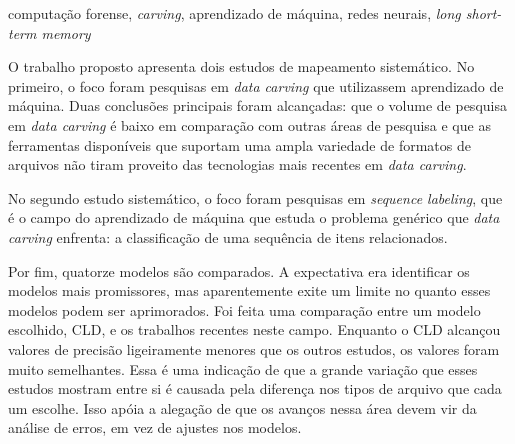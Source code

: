 \documentclass[english,oneside]{pucrs-ppgcc}
\begin{document}
\begin{resumo}{computação forense, \textit{carving}, aprendizado de máquina, redes neurais, \textit{long short-term memory}}

O trabalho proposto apresenta dois estudos de mapeamento sistemático.
No primeiro, o foco foram pesquisas em \textit{data carving} que utilizassem aprendizado de máquina. Duas conclusões principais foram alcançadas: que o volume de pesquisa em \textit{data carving} é baixo em comparação com outras áreas de pesquisa e que as ferramentas disponíveis que suportam uma ampla variedade de formatos de arquivos não tiram proveito das tecnologias mais recentes em \textit{data carving}.

No segundo estudo sistemático, o foco foram pesquisas em \textit{sequence labeling}, que é o campo do aprendizado de máquina que estuda o problema genérico que \textit{data carving} enfrenta: a classificação de uma sequência de itens relacionados. 

Por fim, quatorze modelos são comparados. A expectativa era identificar os modelos mais promissores, mas aparentemente exite um limite no quanto esses modelos podem ser aprimorados.
Foi feita uma comparação entre um modelo escolhido, CLD, e os trabalhos recentes neste campo. Enquanto o CLD alcançou valores de precisão ligeiramente menores que os outros estudos, os valores foram muito semelhantes. Essa é uma indicação de que a grande variação que esses estudos mostram entre si é causada pela diferença nos tipos de arquivo que cada um escolhe. Isso apóia a alegação de que os avanços nessa área devem vir da análise de erros, em vez de ajustes nos modelos.
\end{resumo}
\end{document}

